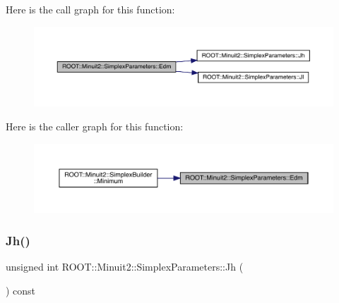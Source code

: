 Here is the call graph for this function\+:
\nopagebreak
\begin{figure}[H]
\begin{center}
\leavevmode
\includegraphics[width=350pt]{d7/da2/classROOT_1_1Minuit2_1_1SimplexParameters_ad71f372dd3873cbf351dc8eddc3a9c9a_cgraph}
\end{center}
\end{figure}
Here is the caller graph for this function\+:\nopagebreak
\begin{figure}[H]
\begin{center}
\leavevmode
\includegraphics[width=350pt]{d7/da2/classROOT_1_1Minuit2_1_1SimplexParameters_ad71f372dd3873cbf351dc8eddc3a9c9a_icgraph}
\end{center}
\end{figure}
\mbox{\label{classROOT_1_1Minuit2_1_1SimplexParameters_a54250c0d286fcf4d6bbb45df037c7d85}} 
\subsubsection{\texorpdfstring{Jh()}{Jh()}\hspace{0.1cm}{\footnotesize\ttfamily [1/2]}}
{\footnotesize\ttfamily unsigned int R\+O\+O\+T\+::\+Minuit2\+::\+Simplex\+Parameters\+::\+Jh (\begin{DoxyParamCaption}{ }\end{DoxyParamCaption}) const\hspace{0.3cm}{\ttfamily [inline]}}

\mbox{\label{classROOT_1_1Minuit2_1_1SimplexParameters_a54250c0d286fcf4d6bbb45df037c7d85}} 
